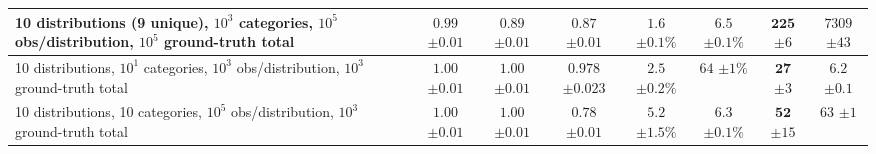 \begin{table*}[t]
\begin{center}
\begin{scriptsize}
\begin{sc}
\begin{tabular}{l||c|c|c||c|c||c|c}
\hline
\makecell{10 distributions (9 unique), $10^3$ categories,\\$10^5$ obs/distribution, $10^5$ ground-truth total} & 
\makecell{$\mathbf{0.99}$\\$\pm 0.01$} & \makecell{$0.89$\\$\pm 0.01$} & \makecell{$0.87$\\$\pm 0.01$} & 
\makecell{$\mathbf{1.6}$\\$\pm 0.1\%$} & \makecell{$6.5$\\$\pm 0.1\%$} & 
\makecell{$\mathbf{225}$\\$\pm 6$} & \makecell{$7309$\\$\pm 43$} \\
\hline
\makecell{10 distributions, $10^1$ categories,\\$10^3$ obs/distribution, $10^3$ ground-truth total} & 
\makecell{$1.00$\\$\pm 0.01$} & \makecell{$1.00$\\$\pm 0.01$} & \makecell{$0.978$\\$\pm 0.023$} & 
\makecell{$\mathbf{2.5}$\\$\pm 0.2\%$} & \makecell{$64$\\$\pm 1\%$} & 
\makecell{$\mathbf{27}$\\$\pm 3$} & \makecell{$6.2$\\$\pm 0.1$} \\
\hline
\makecell{10 distributions, 10 categories,\\$10^5$ obs/distribution, $10^3$ ground-truth total} & 
\makecell{$1.00$\\$\pm 0.01$} & \makecell{$1.00$\\$\pm 0.01$} & \makecell{$0.78$\\$\pm 0.01$} & 
\makecell{$\mathbf{5.2}$\\$\pm 1.5\%$} & \makecell{$6.3$\\$\pm 0.1\%$} & 
\makecell{$\mathbf{52}$\\$\pm 15$} & \makecell{$63$\\$\pm 1$} \\
\hline

\end{tabular}
\end{sc}
\end{scriptsize}
\end{center}
\vskip -0.1in
\end{table*}